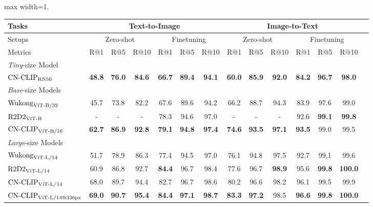 \begin{table}[t]
\center
\small
\vskip 0.15in
\begin{adjustbox}{max width=1.\textwidth}
\begin{tabular}{@{\extracolsep{\fill}}lccccccccccccc}
\toprule
  Tasks
  &\multicolumn{6}{c}{Text-to-Image}
  &\multicolumn{6}{c}{Image-to-Text}
  \\
\midrule
  Setups
  &\multicolumn{3}{c}{Zero-shot}
  &\multicolumn{3}{c}{Finetuning}
  &\multicolumn{3}{c}{Zero-shot}
  &\multicolumn{3}{c}{Finetuning}
  \\
\midrule
  Metrics & R@1 & R@5 & R@10 & R@1 & R@5 & R@10 & R@1 & R@5 & R@10 & R@1 & R@5 & R@10
  \\
\midrule
    \multicolumn{13}{l}{\textit{Tiny}-size Model} \\
    $\text{CN-CLIP}\rm_{RN50}$
    & \textbf{48.8}	& \textbf{76.0}	& \textbf{84.6}	& \textbf{66.7} & \textbf{89.4} & \textbf{94.1} & \textbf{60.0}	& \textbf{85.9}	& \textbf{92.0}	& \textbf{84.2}	& \textbf{96.7}	& \textbf{98.0}
    \\
\midrule
    \multicolumn{13}{l}{\textit{Base}-size Models} \\
    $\text{Wukong}\rm_{ViT\text{-}B/32}$
    & 45.7	& 73.8	& 82.2	& 67.6	& 89.6	& 94.2	& 66.2	& 88.7	& 94.3	& 83.9	& 97.6	& 99.0
    \\
    $\text{R2D2}\rm_{ViT\text{-}B}$
    & -	& -	& -	& 78.3	& 94.6	& 97.0	& -	& -	& -	& 92.6	& \textbf{99.1}	& \textbf{99.8}
    \\
    $\text{CN-CLIP}\rm_{ViT\text{-}B/16}$
    & \textbf{62.7}	& \textbf{86.9}	& \textbf{92.8}	& \textbf{79.1}	& \textbf{94.8}	& \textbf{97.4}	& \textbf{74.6}	& \textbf{93.5}	& \textbf{97.1}	& \textbf{93.5}	& 99.0	& 99.5
    \\
\midrule
    \multicolumn{9}{l}{\textit{Large}-size Models} \\
    $\text{Wukong}\rm_{ViT\text{-}L/14}$
    & 51.7	& 78.9	& 86.3	& 77.4 	& 94.5 	& 97.0	& 76.1	& 94.8	& 97.5	& 92.7 	& 99.1 	& 99.6
    \\
    $\text{R2D2}\rm_{ViT\text{-}L/14}$
    & 60.9	& 86.8	& 92.7	& \textbf{84.4} 	& 96.7 	& 98.4	& 77.6	& 96.7	& \textbf{98.9}	& 95.6 	& \textbf{99.8}	& \textbf{100.0}
    \\
    $\text{CN-CLIP}\rm_{ViT\text{-}L/14}$
    & 68.0	& 89.7	& 94.4	& 82.7	& 96.7	& 98.6	& 80.2	& 96.6	& 98.2	& 96.1	& 99.5	& 99.9
    \\
    $\text{CN-CLIP}\rm_{ViT\text{-}L/14@336px}$
    & \textbf{69.0}	& \textbf{90.7}	& \textbf{95.4}	& \textbf{84.4}	& \textbf{97.1}	& \textbf{98.7}	& \textbf{83.3}	& \textbf{97.2}	& 98.5	& \textbf{96.6}	& \textbf{99.8}	& \textbf{100.0}

\end{tabular}
\end{adjustbox}
\end{table}
